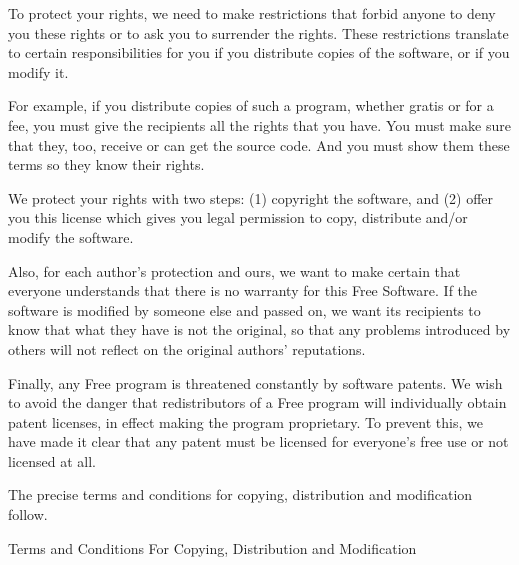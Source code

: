 \documentclass[11pt, letterpaper]{book}
\begin{document}
To protect your rights, we need to make restrictions that forbid anyone to
deny you these rights or to ask you to surrender the rights. These
restrictions translate to certain responsibilities for you if you
distribute copies of the software, or if you modify it.

For example, if you distribute copies of such a program, whether gratis or
for a fee, you must give the recipients all the rights that you have. You
must make sure that they, too, receive or can get the source code. And
you must show them these terms so they know their rights.

We protect your rights with two steps: (1) copyright the software, and (2)
offer you this license which gives you legal permission to copy,
distribute and/or modify the software.

Also, for each author's protection and ours, we want to make certain that
everyone understands that there is no warranty for this Free Software. If
the software is modified by someone else and passed on, we want its
recipients to know that what they have is not the original, so that any
problems introduced by others will not reflect on the original authors'
reputations.

Finally, any Free program is threatened constantly by software patents.
We wish to avoid the danger that redistributors of a Free program will
individually obtain patent licenses, in effect making the program
proprietary. To prevent this, we have made it clear that any patent must
be licensed for everyone's free use or not licensed at all.

The precise terms and conditions for copying, distribution and
modification follow.

\begin{center}
{\Large \sc Terms and Conditions For Copying, Distribution and
  Modification}
\end{center}
\end{document}
